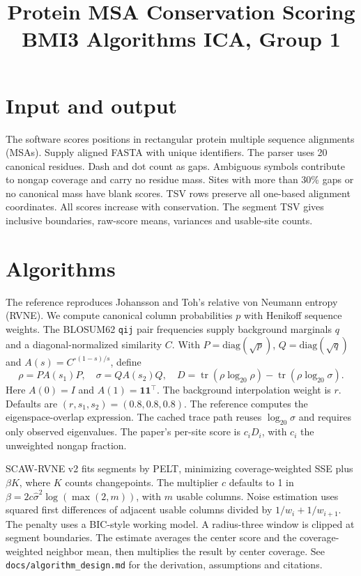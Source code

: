 \documentclass[10pt,a4paper]{article}
\title{\vspace{-1.8em}\textbf{Protein MSA Conservation Scoring}\\
\large BMI3 Algorithms ICA, Group 1}
\author{}
\date{}
\begin{document}
\maketitle
\vspace{-2.4em}

\section{Input and output}
The software scores positions in rectangular protein multiple sequence alignments (MSAs). Supply aligned FASTA with unique identifiers. The parser uses 20 canonical residues. Dash and dot count as gaps. Ambiguous symbols contribute to nongap coverage and carry no residue mass. Sites with more than 30\% gaps or no canonical mass have blank scores. TSV rows preserve all one-based alignment coordinates. All scores increase with conservation. The segment TSV gives inclusive boundaries, raw-score means, variances and usable-site counts.

\section{Algorithms}
The reference reproduces Johansson and Toh's relative von Neumann entropy (RVNE). We compute canonical column probabilities \(p\) with Henikoff sequence weights. The BLOSUM62 \texttt{qij} pair frequencies supply background marginals \(q\) and a diagonal-normalized similarity \(C\). With \(P=\mathrm{diag}(\sqrt p)\), \(Q=\mathrm{diag}(\sqrt q)\) and \(A(s)=C^{\circ(1-s)/s}\), define
\[
  \rho=P A(s_1)P,\quad \sigma=Q A(s_2)Q,\quad
  D=\operatorname{tr}(\rho\log_{20}\rho)-\operatorname{tr}(\rho\log_{20}\sigma).
\]
Here \(A(0)=I\) and \(A(1)=\mathbf 1\mathbf 1^\top\). The background interpolation weight is \(r\). Defaults are \((r,s_1,s_2)=(0.8,0.8,0.8)\). The reference computes the eigenspace-overlap expression. The cached trace path reuses \(\log_{20}\sigma\) and requires only observed eigenvalues. The paper's per-site score is \(c_iD_i\), with \(c_i\) the unweighted nongap fraction.

SCAW-RVNE v2 fits segments by PELT, minimizing coverage-weighted SSE plus \(\beta K\), where \(K\) counts changepoints. The multiplier \(c\) defaults to 1 in \(\beta=2c\widehat\sigma^2\log(\max(2,m))\), with \(m\) usable columns. Noise estimation uses squared first differences of adjacent usable columns divided by \(1/w_i+1/w_{i+1}\). The penalty uses a BIC-style working model. A radius-three window is clipped at segment boundaries. The estimate averages the center score and the coverage-weighted neighbor mean, then multiplies the result by center coverage. See \texttt{docs/algorithm\_design.md} for the derivation, assumptions and citations.
\end{document}
